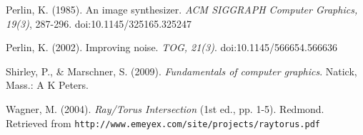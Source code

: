 \begin{thebibliography}{13}
  Perlin, K. (1985). An image synthesizer. \textit{ACM SIGGRAPH Computer Graphics, 19(3)}, 287-296. 
  doi:10.1145/325165.325247
  
  Perlin, K. (2002). Improving noise. \textit{TOG, 21(3)}. doi:10.1145/566654.566636
  
  Shirley, P., \& Marschner, S. (2009). \textit{Fundamentals of computer graphics}. Natick, Mass.: A K Peters.
  
  Wagner, M. (2004). \textit{Ray/Torus Intersection} (1st ed., pp. 1-5). Redmond. 
  Retrieved from \verb|http://www.emeyex.com/site/projects/raytorus.pdf|


\end{thebibliography}

